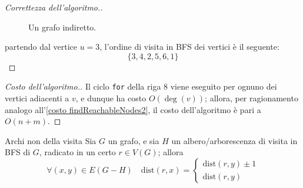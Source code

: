 \documentclass[a4paper, 12pt]{report}
\begin{document}
\begin{proof}[Correttezza dell'algoritmo.]
\begin{figure}[H]
            \caption{Un grafo indiretto.}
        \end{figure}

        partendo dal vertice $u = 3$, l'ordine di visita in BFS dei vertici è il seguente: $$\{3, 4, 2, 5, 6, 1\}$$

    \end{proof}

    \begin{proof}[Costo dell'algoritmo.]
        Il ciclo \texttt{for} della riga $8$ viene eseguito per ognuno dei vertici adiacenti a $v$, e dunque ha costo $O(\deg(v))$; allora, per ragionamento analogo all'\cref{costo findReachableNodes2}, il costo dell'algoritmo è pari a $O(n +m)$.
    \end{proof}

    \begin{framedobs}{Archi non della visita}
        Sia $G$ un grafo, e sia $H$ un albero/arborescenza di visita in BFS di $G$, radicato in un certo $r \in V(G)$; allora $$\forall (x, y) \in E(G - H) \quad \mathrm{dist}(r, x) = \left \{ \begin{array}{l} \mathrm{dist}(r, y) \pm 1 \\ \mathrm{dist}(r, y) \end{array} \right.$$
    \end{framedobs}
\end{document}
